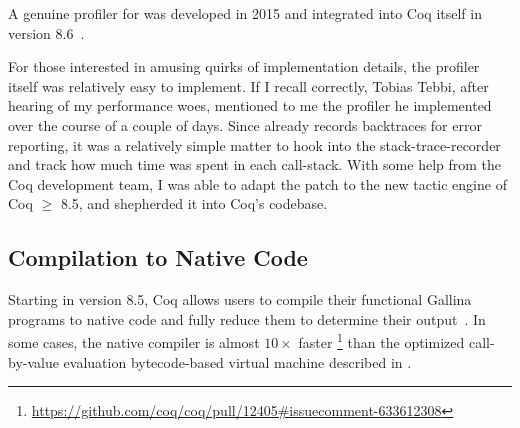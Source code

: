 A genuine profiler for \Ltac\space was developed in 2015 and integrated into Coq itself in version 8.6~\cite{coqpl-15-ltac-profiler}.

For those interested in amusing quirks of implementation details, the profiler itself was relatively easy to implement.
If I recall correctly, Tobias Tebbi, after hearing of my \Ltac\space performance woes, mentioned to me the profiler he implemented over the course of a couple of days.
Since \Ltac\space already records backtraces for error reporting, it was a relatively simple matter to hook into the stack-trace-recorder and track how much time was spent in each call-stack.
With some help from the Coq development team, I was able to adapt the patch to the new tactic engine of Coq $\ge$ 8.5, and shepherded it into Coq's codebase.


\subsection{Compilation to Native Code}\label{sec:native-compiler}
Starting in version 8.5, Coq allows users to compile their functional Gallina programs to native code and fully reduce them to determine their output~\cite{nativecompute,coq-commit-native-compiler}.
In some cases, the native compiler is almost $10\times$ faster%
\footnote{\url{https://github.com/coq/coq/pull/12405\#issuecomment-633612308}}
than the optimized call-by-value evaluation bytecode-based virtual machine described in \textcite{vmcompute}.

